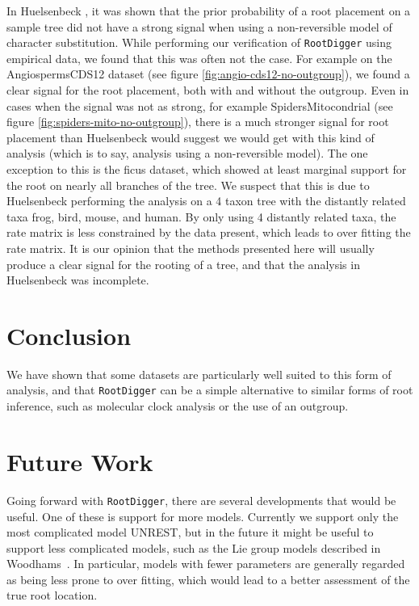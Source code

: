 \documentclass{article}
\newcommand{\RootDiggertt}{\texttt{RootDigger}}
\begin{document}
In Huelsenbeck \cite{huelsenbeck_inferring_2002}, it was shown that the prior
probability of a root placement on a sample tree did not have a strong signal
when using a non-reversible model of character substitution.  While performing
our verification of \RootDiggertt{} using empirical data, we found that this was
often not the case. For example on the AngiospermsCDS12 dataset (see figure
\ref{fig:angio-cds12-no-outgroup}), we found a clear signal for the root
placement, both with and without the outgroup. Even in cases when the signal was
not as strong, for example SpidersMitocondrial (see figure
\ref{fig:spiders-mito-no-outgroup}), there is a much stronger signal for root
placement than Huelsenbeck would suggest we would get with this kind of analysis
(which is to say, analysis using a non-reversible model). The one exception to
this is the ficus dataset, which showed at least marginal support for the root
on nearly all branches of the tree. We suspect that this is due to Huelsenbeck
performing the analysis on a 4 taxon tree with the distantly related taxa frog,
bird, mouse, and human. By only using 4 distantly related taxa, the rate matrix
is less constrained by the data present, which leads to over fitting the rate
matrix.  It is our opinion that the methods presented here will usually produce
a clear signal for the rooting of a tree, and that the analysis in Huelsenbeck
was incomplete.

\section{Conclusion}

We have shown that some datasets are particularly well suited to this form of
analysis, and that \RootDiggertt{} can be a simple alternative to similar forms
of root inference, such as molecular clock analysis or the use of an outgroup.

\section{Future Work}

Going forward with \RootDiggertt{}, there are several developments that would be
useful. One of these is support for more models. Currently we support only the
most complicated model UNREST, but in the future it might be useful to support
less complicated models, such as the Lie group models described in
Woodhams~\cite{woodhams_new_2015}.  In particular, models with fewer parameters
are generally regarded as being less prone to over fitting, which would lead to
a better assessment of the true root location.
\end{document}
